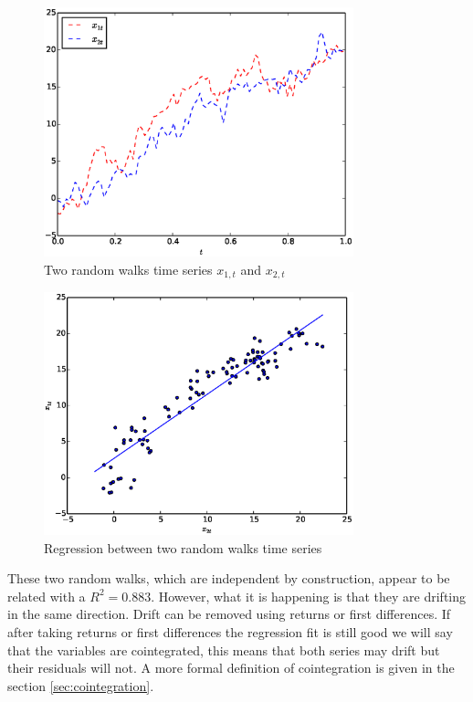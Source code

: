 \begin{figure}[!h]
  \centering
  \includegraphics[width=0.8\textwidth]{img/spurious1}
  \caption{Two random walks time series $x_{1,t}$ and $x_{2,t}$}
  \label{fig:spurious1}
\end{figure}

\begin{figure}[!h]
  \centering
  \includegraphics[width=0.8\textwidth]{img/spurious2}
  \caption{Regression between two random walks time series}
  \label{fig:spurious2}
\end{figure}

These two random walks, which are independent by construction, appear to be
related with a $R^2=0.883$. However, what it is happening is that they are
drifting in the same direction. Drift can be removed using returns or first
differences.  If after taking returns or first differences the regression fit
is still good we will say that the variables are cointegrated, this means that
both series may drift but their residuals will not. A more formal definition of
cointegration is given in the section \ref{sec:cointegration}.

